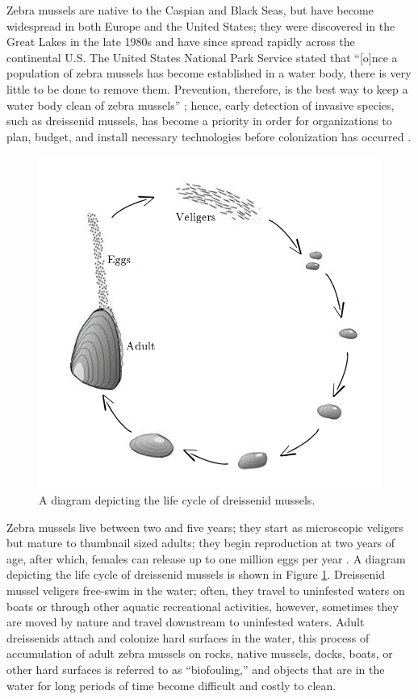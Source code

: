 \documentclass[12pt]{article}\usepackage[]{graphicx}\usepackage[]{color}
\begin{document}
Zebra mussels are native to the Caspian and Black Seas, but have become widespread in both Europe and the United States; they were discovered in the Great Lakes in the late 1980s and have since spread rapidly across the continental U.S. The United States National Park Service stated that ``[o]nce a population of zebra mussels has become established in a water body, there is very little to be done to remove them. Prevention, therefore, is the best way to keep a water body clean of zebra mussels'' \cite{NPS}; hence, early detection of invasive species, such as dreissenid mussels, has become a priority in order for organizations to plan, budget, and install necessary technologies before colonization has occurred \cite{Holser:body}. 

\begin{figure}[]
	\centering
	\includegraphics[scale = 0.7]{images/lifecycle}
	\caption{A diagram depicting the life cycle of dreissenid mussels.}
	\label{fig:lifecycle}
\end{figure}

Zebra mussels live between two and five years; they start as microscopic veligers but mature to thumbnail sized adults; they begin reproduction at two years of age, after which, females can release up to one million eggs per year \cite{NPS}. A diagram depicting the life cycle of dreissenid mussels is shown in Figure \ref{fig:lifecycle}. Dreissenid mussel veligers free-swim in the water; often, they travel to uninfested waters on boats or through other aquatic recreational activities, however, sometimes they are moved by nature and travel downstream to uninfested waters. Adult dreissenids attach and colonize hard surfaces in the water, this process of accumulation of adult zebra mussels on rocks, native mussels, docks, boats, or other hard surfaces is referred to as ``biofouling,'' and objects that are in the water for long periods of time become difficult and costly to clean.
\end{document}
